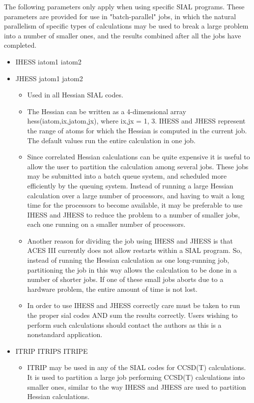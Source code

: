 \documentclass[12pt]{article}
\begin{document}
\noindent 
The following parameters only apply when using specific SIAL programs. These parameters are 
provided for use in "batch-parallel" jobs, in which the natural parallelism of specific 
types of calculations may be used to break a large problem into a number of smaller ones, and 
the results combined after all the jobs have completed.

\begin{itemize} 
\item IHESS iatom1 iatom2
\item JHESS jatom1 jatom2
   \begin{itemize} 
   \item Used in all Hessian SIAL codes.
   \item The Hessian can be written as a 4-dimensional array hess(iatom,ix,jatom,jx),
         where ix,jx = 1, 3.  IHESS and JHESS represent the range of atoms for which
         the Hessian is computed in the current job.  The default values run the
         entire calculation in one job.

   \item Since correlated Hessian calculations can be quite expensive it is useful
   to allow the user to partition the calculation among several jobs. These
   jobs may be submitted into a batch queue system, and scheduled more
   efficiently by the queuing system.  Instead of running a large Hessian
   calculation over a large number of processors, and having to wait a long
   time for the processors to become available, it may be preferable to use
   IHESS and JHESS to reduce the problem to a number of smaller jobs, each one
   running on a smaller number of processors.

   \item Another reason for dividing the job using IHESS and JHESS is that ACES III
   currently does not allow restarts within a SIAL program.  So, instead of
   running the Hessian calculation as one long-running job, partitioning the
   job in this way allows the calculation to be done in a number of shorter
   jobs.  If one of these small jobs aborts due to a hardware problem, the
   entire amount of time is not lost.


   \item In order to use IHESS and JHESS correctly care must be taken to run the
   proper sial codes AND sum the results correctly. Users wishing to
   perform such calculations should contact the authors as this is a nonstandard
   application.
   \end{itemize} 
\item ITRIP ITRIPS ITRIPE
   \begin{itemize} 
   \item ITRIP may be used in any of the SIAL codes for CCSD(T) calculations. It
   is used to partition a large job performing CCSD(T) calculations into
   smaller ones, similar to the way IHESS and JHESS are used to partition
   Hessian calculations.


\end{itemize}
\end{itemize}
\end{document}
